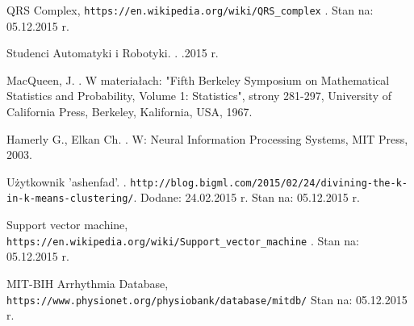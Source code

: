 
\begin{thebibliography}{99} %

 
QRS Complex,
\newblock \texttt{https://en.wikipedia.org/wiki/QRS\_complex} .
\newblock Stan na: 05.12.2015 r.

Studenci Automatyki i Robotyki.
.
.2015 r.

MacQueen, J.
.
\newblock W materiałach: "Fifth Berkeley Symposium on Mathematical Statistics and Probability, Volume 1: Statistics", strony 281-297,
\newblock University of California Press, Berkeley, Kalifornia, USA, 1967. 

Hamerly G., Elkan Ch.
.
\newblock W: Neural Information Processing Systems,
\newblock MIT Press, 2003.

Użytkownik 'ashenfad'.
.
\newblock \texttt{http://blog.bigml.com/2015/02/24/divining-the-k-in-k-means-clustering/}. 
\newblock Dodane: 24.02.2015 r.
\newblock Stan na: 05.12.2015 r.

Support vector machine,
\newblock \texttt{https://en.wikipedia.org/wiki/Support\_vector\_machine} .
\newblock Stan na: 05.12.2015 r.

MIT-BIH Arrhythmia Database,
\newblock \texttt{https://www.physionet.org/physiobank/database/mitdb/}
\newblock Stan na: 05.12.2015 r.



\end{thebibliography}